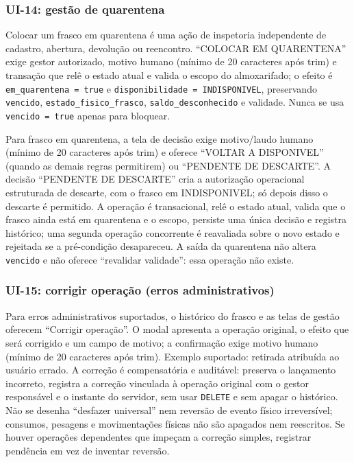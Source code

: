 \subsubsection{UI-14: gestão de quarentena}
Colocar um frasco em quarentena é uma ação de inspetoria independente de cadastro, abertura, devolução ou reencontro. ``COLOCAR EM QUARENTENA'' exige gestor autorizado, motivo humano (mínimo de 20 caracteres após trim) e transação que relê o estado atual e valida o escopo do almoxarifado; o efeito é \texttt{em\_quarentena = true} e \texttt{disponibilidade = INDISPONIVEL}, preservando \texttt{vencido}, \texttt{estado\_fisico\_frasco}, \texttt{saldo\_desconhecido} e validade. Nunca se usa \texttt{vencido = true} apenas para bloquear.

Para frasco em quarentena, a tela de decisão exige motivo/laudo humano (mínimo de 20 caracteres após trim) e oferece ``VOLTAR A DISPONIVEL'' (quando as demais regras permitirem) ou ``PENDENTE DE DESCARTE''. A decisão ``PENDENTE DE DESCARTE'' cria a autorização operacional estruturada de descarte, com o frasco em INDISPONIVEL; só depois disso o descarte é permitido. A operação é transacional, relê o estado atual, valida que o frasco ainda está em quarentena e o escopo, persiste uma única decisão e registra histórico; uma segunda operação concorrente é reavaliada sobre o novo estado e rejeitada se a pré-condição desapareceu. A saída da quarentena não altera \texttt{vencido} e não oferece ``revalidar validade'': essa operação não existe.

\subsubsection{UI-15: corrigir operação (erros administrativos)}
Para erros administrativos suportados, o histórico do frasco e as telas de gestão oferecem ``Corrigir operação''. O modal apresenta a operação original, o efeito que será corrigido e um campo de motivo; a confirmação exige motivo humano (mínimo de 20 caracteres após trim). Exemplo suportado: retirada atribuída ao usuário errado. A correção é compensatória e auditável: preserva o lançamento incorreto, registra a correção vinculada à operação original com o gestor responsável e o instante do servidor, sem usar \texttt{DELETE} e sem apagar o histórico. Não se desenha ``desfazer universal'' nem reversão de evento físico irreversível; consumos, pesagens e movimentações físicas não são apagados nem reescritos. Se houver operações dependentes que impeçam a correção simples, registrar pendência em vez de inventar reversão.

